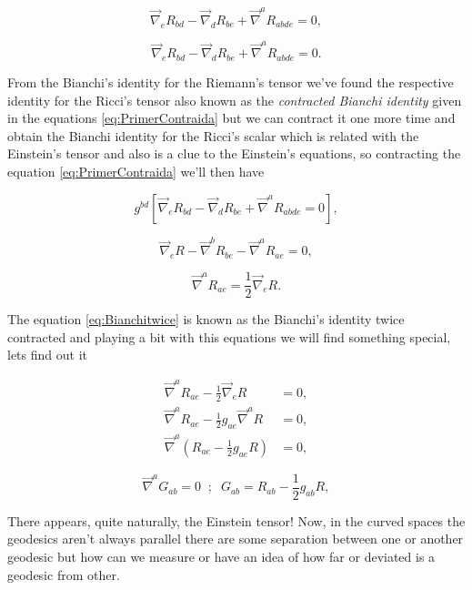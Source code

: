 \begin{equation}
    \Vec{\nabla}_eR_{bd} - \Vec{\nabla}_dR_{be} + \Vec{\nabla}^aR_{abde}=0,
\end{equation}

\begin{equation}\label{eq:PrimerContraida}
    \Vec{\nabla}_eR_{bd} - \Vec{\nabla}_dR_{be}+\Vec{\nabla}^aR_{abde}=0.
\end{equation}

From the Bianchi's identity for the Riemann's tensor we've found the respective identity for the Ricci's tensor also known as the \textit{contracted Bianchi identity} given in the equations \ref{eq:PrimerContraida} but we can contract it one more time and obtain the Bianchi identity for the Ricci's scalar which is related with the Einstein's tensor and also is a clue to the Einstein's equations, so contracting the equation \ref{eq:PrimerContraida} we'll then have

\begin{equation}
    g^{bd}\left[\Vec{\nabla}_eR_{bd}-\Vec{\nabla}_dR_{be} + \Vec{\nabla}^aR_{abde} = 0\right],
\end{equation}

\begin{equation}
    \Vec{\nabla}_eR-\Vec{\nabla}^bR_{be}-\Vec{\nabla}^aR_{ae}=0,
\end{equation}

\begin{equation}\label{eq:Bianchitwice}
    \Vec{\nabla}^aR_{ae}=\frac{1}{2}\Vec{\nabla}_eR.
\end{equation}

The equation \ref{eq:Bianchitwice} is known as the Bianchi's identity twice contracted and playing a bit with this equations we will find something special, lets find out it

\begin{align*}
    \Vec{\nabla}^aR_{ae}-\frac{1}{2}\Vec{\nabla}_eR&=0,\\
    \Vec{\nabla}^aR_{ae}-\frac{1}{2}g_{ae}\Vec{\nabla}^aR&=0,\\
    \Vec{\nabla}^a\left(R_{ae}-\frac{1}{2}g_{ae}R \right)&=0,
\end{align*}

\begin{equation}
    \Vec{\nabla}^aG_{ab}=0\;\;;\;\;G_{ab}=R_{ab}-\frac{1}{2}g_{ab}R,
\end{equation}

There appears, quite naturally, the Einstein tensor! Now, in the curved spaces the geodesics aren't always parallel there are some separation between one or another geodesic but how can we measure or have an idea of how far or deviated is a geodesic from other.

